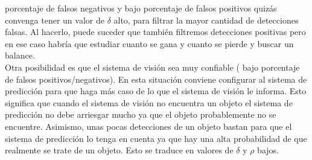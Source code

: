 	porcentaje de falsos negativos y bajo porcentaje de falsos 
	positivos quizás convenga tener un valor de $\delta$ alto, para 
	filtrar la mayor cantidad de detecciones falsas. Al hacerlo, puede 
	suceder que también filtremos detecciones positivas pero en ese 
	caso habría que estudiar cuanto se gana y cuanto se pierde y 
	buscar un balance.\\
	\indent Otra posibilidad es que el sistema de visión sea muy 
	confiable ( bajo porcentaje de falsos positivos/negativos). En 
	esta situación conviene configurar al sistema de predicción para 
	que haga más caso de lo que el sistema de visión le informa. Esto 
	significa que cuando el sistema de visión no encuentra un objeto 
	el sistema de predicción no debe arriesgar mucho ya que el objeto 
	probablemente no se encuentre. Asimismo, unas pocas detecciones de 
	un objeto bastan para que el sistema de predicción lo tenga 
	en cuenta  ya que hay una alta probabilidad de que 
	realmente se trate de un objeto. Esto se traduce en valores de 
	$\delta$ y $\rho$ bajos.
 



